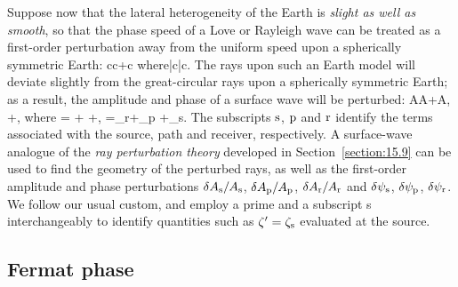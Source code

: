 Suppose now that the lateral heterogeneity of the Earth
is {\em slight as well as smooth\/}, so that the phase
speed of a Love or Rayleigh wave can be treated as a
%
%
first-order perturbation away from the uniform speed
upon a spherically symmetric Earth:
\eq \label{16.raypert1}
c\rightarrow c+\delta c \quad\mbox{where}\quad |\delta c|\ll c.
\en
The rays upon such an Earth model will deviate slightly
from the great-circular rays upon a spherically symmetric
Earth; as a result, the amplitude and phase of a surface
wave will be perturbed:
\eq
A\rightarrow A+\delta A,\qquad
\psi\rightarrow\psi+\delta\psi,
\en
where
\eq \label{16.dA}
=
+
+,
\en
\eq \label{16.dpsi}
\delta\psi=\delta\psi_{\rm r}+\delta\psi_{\rm p}
+\delta\psi_{\rm s}.
\en
The subscripts ${\rm s}$, ${\rm p}$ and ${\rm r}$
identify the terms associated with the source, path
and receiver, respectively.  A surface-wave analogue of
the {\em ray perturbation theory\/} developed in Section~\ref{section:15.9}
can be used to find the geometry of the perturbed rays,
as well as the first-order amplitude and phase perturbations
$\delta A_{\rm s}/A_{\rm s}$, $\delta A_{\rm p}/A_{\rm p}$,
$\delta A_{\rm r}/A_{\rm r}$ and $\delta\psi_{\rm s}$,
$\delta\psi_{\rm p}$, $\delta\psi_{\rm r}$.  We follow
our usual custom, and employ a prime and a subscript s
interchangeably to identify quantities such as
$\zeta'=\zeta_{\rm s}$ evaluated at the source.

\subsection{Fermat phase}
%

